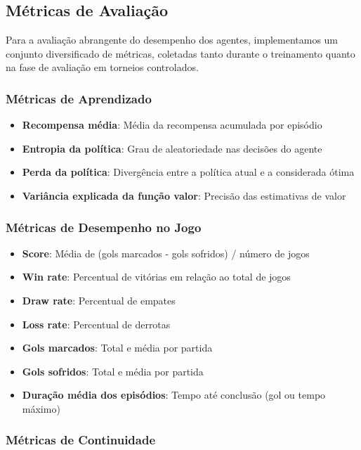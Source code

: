 \subsection{Métricas de Avaliação}

Para a avaliação abrangente do desempenho dos agentes, implementamos um conjunto diversificado de métricas, coletadas tanto durante o treinamento quanto na fase de avaliação em torneios controlados.

\subsubsection{Métricas de Aprendizado}

\begin{itemize}
    \item \textbf{Recompensa média}: Média da recompensa acumulada por episódio
    \item \textbf{Entropia da política}: Grau de aleatoriedade nas decisões do agente
    \item \textbf{Perda da política}: Divergência entre a política atual e a considerada ótima
    \item \textbf{Variância explicada da função valor}: Precisão das estimativas de valor
\end{itemize}

\subsubsection{Métricas de Desempenho no Jogo}

\begin{itemize}
    \item \textbf{Score}: Média de (gols marcados - gols sofridos) / número de jogos
    \item \textbf{Win rate}: Percentual de vitórias em relação ao total de jogos
    \item \textbf{Draw rate}: Percentual de empates
    \item \textbf{Loss rate}: Percentual de derrotas
    \item \textbf{Gols marcados}: Total e média por partida
    \item \textbf{Gols sofridos}: Total e média por partida
    \item \textbf{Duração média dos episódios}: Tempo até conclusão (gol ou tempo máximo)
\end{itemize}

\subsubsection{Métricas de Continuidade}

